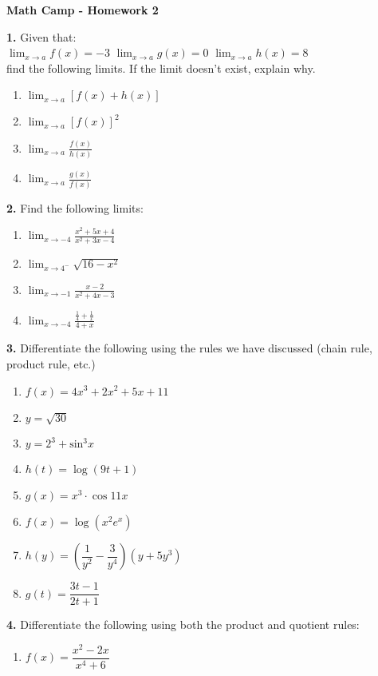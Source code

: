 \documentclass[12pt]{article}
\begin{document}
	
	\centerline{\bf Math Camp - Homework 2}
	


\noindent \textbf{1.} Given that: \\


$\lim_{x \to a} f(x) = -3$ \hfill $\lim_{x \to a} g(x) = 0$ \hfill $\lim_{x \to a} h(x) = 8$\\

find the following limits. If the limit doesn't exist, explain why. 

\begin{multicols}{2}
\begin{enumerate}
\item $\lim_{x \to a} [f(x) + h(x)]$
\item $\lim_{x \to a}  [f(x)]^2$
\item $\lim_{x \to a}  \frac{f(x)}{h(x)}$
\item $\lim_{x \to a}  \frac{g(x)}{f(x)}$
\end{enumerate}
\end{multicols}

\bigskip
\noindent \textbf{2.} Find the following limits:
\begin{multicols}{2}
\begin{enumerate}
\item $\lim_{x \to -4} \frac{x^2 + 5x + 4}{x^2 + 3x -4}$

\item $\lim_{x \to 4^{-}} \sqrt{16 - x^2}$

\item $\lim_{x \to -1} \frac{x-2}{x^2 + 4x -3}$

\item $\lim_{x \to -4} \frac{\frac{1}{4} + \frac{1}{x}}{4 + x}$

\end{enumerate}
\end{multicols}


\bigskip 


\noindent \textbf{3.} Differentiate the following using the rules we have discussed (chain rule, product rule, etc.)
\begin{multicols}{2}
\begin{enumerate}
\item $ f(x) = 4x^3 + 2x^2 + 5x + 11    $
\item $ y = \sqrt{30}   $
\item $ y = 2^3 + \mbox{sin}^3x $
\item $ h(t) = \log(9t+1) $
\item $ g(x) = x^3 \cdot \cos 11x$
\item $ f(x) = \log(x^2e^x)$
\item $ h(y) = ( \dfrac{1}{y^2} - \dfrac{3}{y^4})(y+5y^3)$
\item $ g(t) =  \dfrac{3t-1}{2t+1}$
\end{enumerate}
\end{multicols}


\bigskip 


\noindent \textbf{4.} Differentiate the following using both the product and quotient rules:

\begin{enumerate}
\item $f(x) = \dfrac{x^2-2x}{x^4 + 6}$
\end{enumerate}
\end{document}

